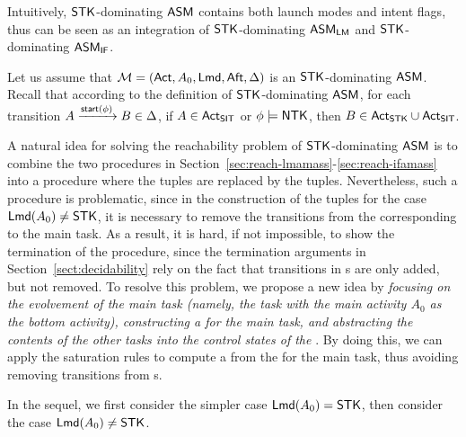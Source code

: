 
Intuitively, $\mathsf{STK}$-dominating $\textsf{ASM}$ contains both launch modes and intent flags, thus can be seen as an integration of $\mathsf{STK}$-dominating $\textsf{ASM}_\textsf{LM}$ and $\mathsf{STK}$-dominating $\textsf{ASM}_\textsf{IF}$. 

Let us assume that ${\mathcal{M} } = ({\sf Act},A_0,{\sf Lmd},{\sf Aft},\Delta)$ is an $\mathsf{STK}$-dominating $\textsf{ASM}$. Recall that according to the definition of ${\sf STK}$-dominating $\textsf{ASM}$, for each transition $A \xrightarrow{{\mathsf{start} }(\phi)} B \in \Delta$, if $A \in {\sf Act}_{\sf SIT}$ or $\phi \models {\sf NTK}$, then $B \in {\sf Act}_{\sf STK} \cup {\sf Act}_{\sf SIT}$.

A natural idea for solving the reachability problem of $\mathsf{STK}$-dominating $\textsf{ASM}$ is to combine the two procedures in Section~\ref{sec:reach-lmamass}-\ref{sec:reach-ifamass} into a procedure where the {\NFA} tuples are replaced by the {\WOTrNFA} tuples.  
Nevertheless, such a procedure is problematic, since in the construction of the {\WOTrNFA} tuples for the case ${\sf Lmd}(A_0) \neq {\sf STK}$, it is necessary to remove the transitions from the {\WOTrNFA} corresponding to the main task. As a result, it is hard, if not impossible, to show the termination of the procedure, since the termination arguments in Section~\ref{sect:decidability} rely on the fact that transitions in {\WOTrNFA}s are only added, but not removed. 
To resolve this problem, we propose a new idea by \emph{focusing on the evolvement of the main task (namely, the task with the main activity $A_0$ as the bottom activity), constructing a {\WOTrPDS} for the main task, and abstracting the contents of the other tasks into the control states of the {\WOTrPDS}}. By doing this, we can apply the saturation rules to compute a {\WOTrNFA} from the {\WOTrPDS} for the main task, thus avoiding removing transitions from {\WOTrNFA}s.

In the sequel, we first consider the simpler case ${\sf Lmd}(A_0) = {\sf STK}$, then consider the case ${\sf Lmd}(A_0) \neq {\sf STK}$.


